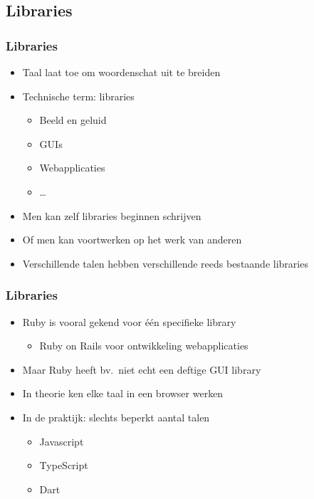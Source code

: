 \subsection{Libraries}

\begin{frame}
  \tableofcontents[currentsubsection]
\end{frame}

\begin{frame}
  \frametitle{Libraries}
  \begin{itemize}
    \item Taal laat toe om woordenschat uit te breiden
    \item Technische term: libraries
          \begin{itemize}
            \item Beeld en geluid
            \item GUIs
            \item Webapplicaties
            \item \dots
          \end{itemize}
    \item Men kan zelf libraries beginnen schrijven
    \item Of men kan voortwerken op het werk van anderen
    \item Verschillende talen hebben verschillende reeds bestaande libraries
  \end{itemize}
\end{frame}

\begin{frame}
  \frametitle{Libraries}
  \begin{itemize}
    \item Ruby is vooral gekend voor \'e\'en specifieke library
          \begin{itemize}
            \item Ruby on Rails voor ontwikkeling webapplicaties
          \end{itemize}
    \item Maar Ruby heeft bv.~niet echt een deftige GUI library
  \end{itemize}
  \vskip4mm
  \begin{itemize}
    \item In theorie ken elke taal in een browser werken
    \item In de praktijk: slechts beperkt aantal talen
          \begin{itemize}
            \item Javascript
            \item TypeScript
            \item Dart
          \end{itemize}
  \end{itemize}
\end{frame}

